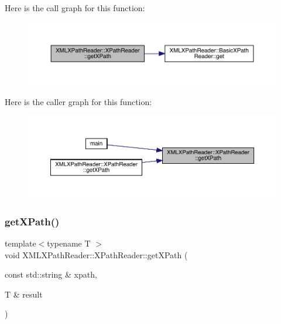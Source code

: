Here is the call graph for this function\+:
\nopagebreak
\begin{figure}[H]
\begin{center}
\leavevmode
\includegraphics[width=350pt]{d3/d5a/classXMLXPathReader_1_1XPathReader_abbd673bc00e75502126b2cca246ff6f4_cgraph}
\end{center}
\end{figure}
Here is the caller graph for this function\+:\nopagebreak
\begin{figure}[H]
\begin{center}
\leavevmode
\includegraphics[width=350pt]{d3/d5a/classXMLXPathReader_1_1XPathReader_abbd673bc00e75502126b2cca246ff6f4_icgraph}
\end{center}
\end{figure}
\mbox{\label{classXMLXPathReader_1_1XPathReader_abbd673bc00e75502126b2cca246ff6f4}} 
\subsubsection{\texorpdfstring{getXPath()}{getXPath()}\hspace{0.1cm}{\footnotesize\ttfamily [2/6]}}
{\footnotesize\ttfamily template$<$typename T $>$ \\
void X\+M\+L\+X\+Path\+Reader\+::\+X\+Path\+Reader\+::get\+X\+Path (\begin{DoxyParamCaption}\item[{const std\+::string \&}]{xpath,  }\item[{T \&}]{result }\end{DoxyParamCaption})\hspace{0.3cm}{\ttfamily [inline]}}

